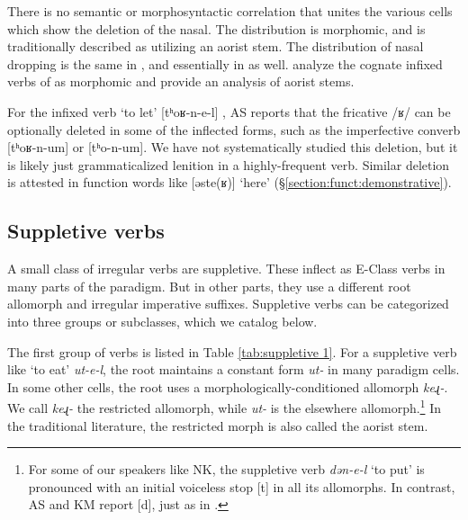 There is no semantic or morphosyntactic correlation that unites the various cells which show the deletion of the nasal. The distribution is morphomic, and is traditionally described as utilizing an aorist stem. The distribution of nasal dropping is the same in {\seaSEA}, and essentially in {\swaSWA} as well. \citet{DolatianGuekguezian-prep-Morphome} analyze the cognate infixed verbs of {\swaSWA} as morphomic and provide an analysis of aorist stems. 

For the infixed verb `to let' [tʰoʁ-n-e-l] , AS reports that the fricative /ʁ/ can be optionally deleted in some of the inflected forms, such as the imperfective converb [tʰoʁ-n-um] or [tʰo-n-um]. We have not systematically studied this deletion, but it is likely just grammaticalized lenition in a highly-frequent verb. Similar deletion is attested in function words like [əste(ʁ)] `here' (\S\ref{section:funct:demonstrative}).\pagebreak

\subsection{Suppletive verbs}\label{section:verb:irregular:suppletive}
A small class of irregular verbs are suppletive. These inflect as E-Class verbs in many parts of the paradigm. But in other parts, they use a different root allomorph and irregular imperative suffixes. Suppletive verbs can be categorized into three groups or subclasses, which we catalog below.

The first group of verbs is listed in Table \ref{tab:suppletive 1}. For a suppletive verb like `to eat' \textit{{ut-e-l}}, the root maintains a constant form \textit{{ut-}} in many paradigm cells. In some other cells, the root uses a morphologically-conditioned allomorph \textit{{keɻ-}}. We call \textit{{keɻ-}} the restricted allomorph, while \textit{{ut-}} is the elsewhere allomorph.\footnote{For some of our speakers like NK, the suppletive verb \textit{{dən-e-l}} `to put' is pronounced with an initial voiceless stop [t] in all its allomorphs. In contrast, AS and KM report [d], just as in {\seaSEA}. } In the traditional literature, the restricted morph is also called the aorist stem. 

